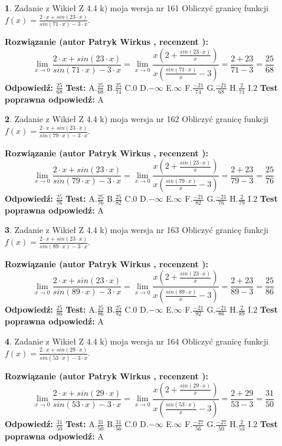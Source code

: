 \documentclass[12pt, a4paper]{article}
\theoremstyle{definition} %
\newtheorem{zad}{}
\newcommand{\zadStart}[1]{\begin{zad}#1\newline}
\newcommand{\zadStop}{\end{zad}}
\newcommand{\rozwStart}[2]{\noindent \textbf{Rozwiązanie (autor #1 , recenzent #2): }\newline}
\newcommand{\rozwStop}{\newline}
\newcommand{\odpStart}{\noindent \textbf{Odpowiedź:}\newline}
\newcommand{\odpStop}{\newline}
\newcommand{\testStart}{\noindent \textbf{Test:}\newline}
\newcommand{\testStop}{\newline}
\newcommand{\kluczStart}{\noindent \textbf{Test poprawna odpowiedź:}\newline}
\newcommand{\kluczStop}{\newline}
\begin{document}
\zadStart{Zadanie z Wikieł Z 4.4 k) moja wersja nr 161}
Obliczyć granicę funkcji $f(x)=\frac{2\cdot x +sin(23\cdot x)}{sin(71\cdot x) -3\cdot x}$.
\zadStop
\rozwStart{Patryk Wirkus}{}
$$\lim\limits_{x\to 0}\frac{2\cdot x +sin(23\cdot x)}{sin(71\cdot x) -3\cdot x}
=\lim\limits_{x\to 0}\frac{x(2+\frac{sin(23\cdot x)}{x})}{x(\frac{sin(71\cdot x)}{x}-3)}
=\frac{2+23}{71-3} = \frac{25}{68}$$
\rozwStop
\odpStart
$\frac{25}{68}$
\odpStop
\testStart
A.$\frac{25}{68}$
B.$\frac{25}{74}$
C.$0$
D.$-\infty$
E.$\infty$
F.$\frac{-21}{74}$
G.$\frac{-21}{68}$
H.$\frac{2}{71}$
I.$2$
\testStop
\kluczStart
A
\kluczStop



\zadStart{Zadanie z Wikieł Z 4.4 k) moja wersja nr 162}
Obliczyć granicę funkcji $f(x)=\frac{2\cdot x +sin(23\cdot x)}{sin(79\cdot x) -3\cdot x}$.
\zadStop
\rozwStart{Patryk Wirkus}{}
$$\lim\limits_{x\to 0}\frac{2\cdot x +sin(23\cdot x)}{sin(79\cdot x) -3\cdot x}
=\lim\limits_{x\to 0}\frac{x(2+\frac{sin(23\cdot x)}{x})}{x(\frac{sin(79\cdot x)}{x}-3)}
=\frac{2+23}{79-3} = \frac{25}{76}$$
\rozwStop
\odpStart
$\frac{25}{76}$
\odpStop
\testStart
A.$\frac{25}{76}$
B.$\frac{25}{82}$
C.$0$
D.$-\infty$
E.$\infty$
F.$\frac{-21}{82}$
G.$\frac{-21}{76}$
H.$\frac{2}{79}$
I.$2$
\testStop
\kluczStart
A
\kluczStop



\zadStart{Zadanie z Wikieł Z 4.4 k) moja wersja nr 163}
Obliczyć granicę funkcji $f(x)=\frac{2\cdot x +sin(23\cdot x)}{sin(89\cdot x) -3\cdot x}$.
\zadStop
\rozwStart{Patryk Wirkus}{}
$$\lim\limits_{x\to 0}\frac{2\cdot x +sin(23\cdot x)}{sin(89\cdot x) -3\cdot x}
=\lim\limits_{x\to 0}\frac{x(2+\frac{sin(23\cdot x)}{x})}{x(\frac{sin(89\cdot x)}{x}-3)}
=\frac{2+23}{89-3} = \frac{25}{86}$$
\rozwStop
\odpStart
$\frac{25}{86}$
\odpStop
\testStart
A.$\frac{25}{86}$
B.$\frac{25}{92}$
C.$0$
D.$-\infty$
E.$\infty$
F.$\frac{-21}{92}$
G.$\frac{-21}{86}$
H.$\frac{2}{89}$
I.$2$
\testStop
\kluczStart
A
\kluczStop



\zadStart{Zadanie z Wikieł Z 4.4 k) moja wersja nr 164}
Obliczyć granicę funkcji $f(x)=\frac{2\cdot x +sin(29\cdot x)}{sin(53\cdot x) -3\cdot x}$.
\zadStop
\rozwStart{Patryk Wirkus}{}
$$\lim\limits_{x\to 0}\frac{2\cdot x +sin(29\cdot x)}{sin(53\cdot x) -3\cdot x}
=\lim\limits_{x\to 0}\frac{x(2+\frac{sin(29\cdot x)}{x})}{x(\frac{sin(53\cdot x)}{x}-3)}
=\frac{2+29}{53-3} = \frac{31}{50}$$
\rozwStop
\odpStart
$\frac{31}{50}$
\odpStop
\testStart
A.$\frac{31}{50}$
B.$\frac{31}{56}$
C.$0$
D.$-\infty$
E.$\infty$
F.$\frac{-27}{56}$
G.$\frac{-27}{50}$
H.$\frac{2}{53}$
I.$2$
\testStop
\kluczStart
A
\kluczStop
\end{document}
